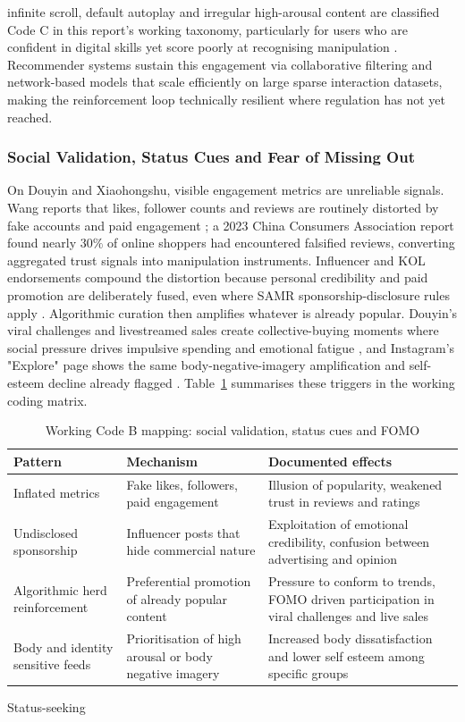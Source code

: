 \documentclass[11pt]{article}
\begin{document}
infinite scroll, default autoplay and irregular high-arousal content are classified Code C in this report's working taxonomy, particularly for users who are confident in digital skills yet score poorly at recognising manipulation \parencites[10]{9360054}[2]{3303310}[2]{8958037}. Recommender systems sustain this engagement via collaborative filtering and network-based models \parencites[3]{7422270} that scale efficiently on large sparse interaction datasets, making the reinforcement loop technically resilient where regulation has not yet reached.

\subsubsection{Social Validation, Status Cues and Fear of Missing Out}
\label{sec:social_validation_status_fomo} On Douyin and Xiaohongshu, visible engagement metrics are unreliable signals. Wang reports that likes, follower counts and reviews are routinely distorted by fake accounts and paid engagement \parencites[13]{7160486}; a 2023 China Consumers Association report found nearly $30\%$ of online shoppers had encountered falsified reviews, converting aggregated trust signals into manipulation instruments. Influencer and KOL endorsements compound the distortion because personal credibility and paid promotion are deliberately fused, even where SAMR sponsorship-disclosure rules apply \parencites[13]{7160486}. Algorithmic curation then amplifies whatever is already popular. Douyin's viral challenges and livestreamed sales create collective-buying moments where social pressure drives impulsive spending and emotional fatigue \parencites[13]{7160486}, and Instagram's "Explore" page shows the same body-negative-imagery amplification and self-esteem decline already flagged \parencites[2]{3303310}[3]{3303310}. Table~\ref{tab:status_fomo} summarises these triggers in the working coding matrix. \begin{table}[H] \centering \caption{Working Code B mapping: social validation, status cues and FOMO} \label{tab:status_fomo} \begin{tabular}{p{3cm}p{4.5cm}p{4.5cm}} \hline Pattern & Mechanism & Documented effects \\ \hline Inflated metrics & Fake likes, followers, paid engagement & Illusion of popularity, weakened trust in reviews and ratings \\ Undisclosed sponsorship & Influencer posts that hide commercial nature & Exploitation of emotional credibility, confusion between advertising and opinion \\ Algorithmic herd reinforcement & Preferential promotion of already popular content & Pressure to conform to trends, FOMO driven participation in viral challenges and live sales \parencites[13]{7160486} \\ Body and identity sensitive feeds & Prioritisation of high arousal or body negative imagery & Increased body dissatisfaction and lower self esteem among specific groups \parencites[3]{3303310} \\ \hline \end{tabular} \end{table} Status-seeking 
\end{document}
